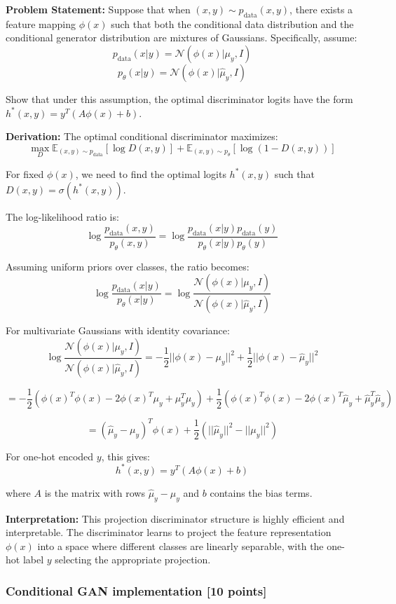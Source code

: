 \documentclass{article}
\begin{document}
\textbf{Problem Statement:} Suppose that when $(x, y) \sim p_{\text{data}}(x, y)$, there exists a feature mapping $\phi(x)$ such that both the conditional data distribution and the conditional generator distribution are mixtures of Gaussians. Specifically, assume:
\[
p_{\text{data}}(x|y) = \mathcal{N}(\phi(x)|\mu_y, I)
\]
\[
p_\theta(x|y) = \mathcal{N}(\phi(x)|\hat{\mu}_y, I)
\]

Show that under this assumption, the optimal discriminator logits have the form $h^*(x,y) = y^T (A \phi(x) + b)$.

\textbf{Derivation:} The optimal conditional discriminator maximizes:
\[
\max_D \mathbb{E}_{(x,y)\sim p_{\text{data}}} [\log D(x,y)] + \mathbb{E}_{(x,y)\sim p_\theta} [\log(1 - D(x,y))]
\]

For fixed $\phi(x)$, we need to find the optimal logits $h^*(x,y)$ such that $D(x,y) = \sigma(h^*(x,y))$.

The log-likelihood ratio is:
\[
\log \frac{p_{\text{data}}(x,y)}{p_\theta(x,y)} = \log \frac{p_{\text{data}}(x|y) p_{\text{data}}(y)}{p_\theta(x|y) p_\theta(y)}
\]

Assuming uniform priors over classes, the ratio becomes:
\[
\log \frac{p_{\text{data}}(x|y)}{p_\theta(x|y)} = \log \frac{\mathcal{N}(\phi(x)|\mu_y, I)}{\mathcal{N}(\phi(x)|\hat{\mu}_y, I)}
\]

For multivariate Gaussians with identity covariance:
\[
\log \frac{\mathcal{N}(\phi(x)|\mu_y, I)}{\mathcal{N}(\phi(x)|\hat{\mu}_y, I)} = -\frac{1}{2}||\phi(x)-\mu_y||^2 + \frac{1}{2}||\phi(x)-\hat{\mu}_y||^2
\]

\[
= -\frac{1}{2}(\phi(x)^T\phi(x) - 2\phi(x)^T\mu_y + \mu_y^T\mu_y) + \frac{1}{2}(\phi(x)^T\phi(x) - 2\phi(x)^T\hat{\mu}_y + \hat{\mu}_y^T\hat{\mu}_y)
\]

\[
= (\hat{\mu}_y - \mu_y)^T \phi(x) + \frac{1}{2}(||\hat{\mu}_y||^2 - ||\mu_y||^2)
\]

For one-hot encoded $y$, this gives:
\[
h^*(x,y) = y^T (A \phi(x) + b)
\]

where $A$ is the matrix with rows $\hat{\mu}_y - \mu_y$ and $b$ contains the bias terms.

\textbf{Interpretation:} This projection discriminator structure is highly efficient and interpretable. The discriminator learns to project the feature representation $\phi(x)$ into a space where different classes are linearly separable, with the one-hot label $y$ selecting the appropriate projection.

\subsubsection{Conditional GAN implementation [10 points]}
\end{document}
